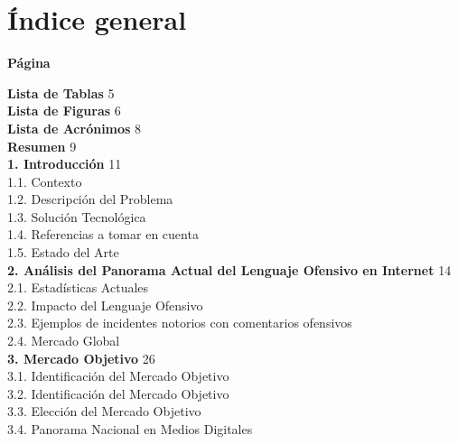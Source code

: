 \chapter*{Índice general}

\begin{flushright}
\textbf{Página}
\end{flushright}

\noindent \textbf{Lista de Tablas} \hfill 5\\[0.2cm]
\noindent \textbf{Lista de Figuras} \hfill 6\\[0.2cm]
\noindent \textbf{Lista de Acrónimos} \hfill 8\\[0.2cm]
\noindent \textbf{Resumen} \hfill 9\\[0.4cm]

\noindent \textbf{1. Introducción} \hfill 11\\
\hspace*{1cm}1.1. Contexto \\
\hspace*{1cm}1.2. Descripción del Problema \\
\hspace*{1cm}1.3. Solución Tecnológica \\
\hspace*{1cm}1.4. Referencias a tomar en cuenta \\
\hspace*{1cm}1.5. Estado del Arte \\[0.3cm]

\noindent \textbf{2. Análisis del Panorama Actual del Lenguaje Ofensivo en Internet} \hfill 14\\
\hspace*{1cm}2.1. Estadísticas Actuales \\
\hspace*{1cm}2.2. Impacto del Lenguaje Ofensivo \\
\hspace*{1cm}2.3. Ejemplos de incidentes notorios con comentarios ofensivos \\
\hspace*{1cm}2.4. Mercado Global \\[0.3cm]

\noindent \textbf{3. Mercado Objetivo} \hfill 26\\
\hspace*{1cm}3.1. Identificación del Mercado Objetivo \\
\hspace*{1cm}3.2. Identificación del Mercado Objetivo \\
\hspace*{1cm}3.3. Elección del Mercado Objetivo \\
\hspace*{1cm}3.4. Panorama Nacional en Medios Digitales \\[0.3cm]

